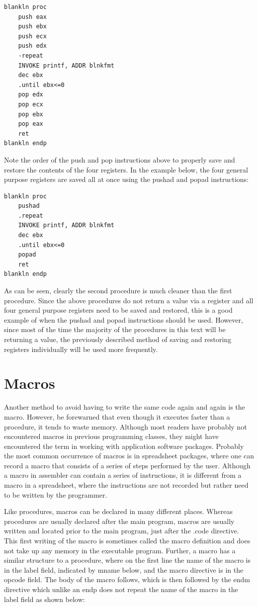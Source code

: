 \documentclass[10pt]{book}
\begin{document}
\begin{verbatim}
blankln proc
    push eax
    push ebx
    push ecx
    push edx
    -repeat
    INVOKE printf, ADDR blnkfmt
    dec ebx
    .until ebx<=0
    pop edx
    pop ecx
    pop ebx
    pop eax
    ret
blankln endp
\end{verbatim}

Note the order of the push and pop instructions above to properly save and restore the contents of the four registers. In the example below, the four general purpose registers are saved all at once using the pushad and popad instructions:

\begin{verbatim}
blankln proc
    pushad
    .repeat
    INVOKE printf, ADDR blnkfmt
    dec ebx
    .until ebx<=0
    popad
    ret
blankln endp
\end{verbatim}

As can be seen, clearly the second procedure is much cleaner than the first procedure. Since the above procedures do not return a value via a register and all four general purpose registers need to be saved and restored, this is a good example of when the pushad and popad instructions should be used. However, since most of the time the majority of the procedures in this text will be returning a value, the previously described method of saving and restoring registers individually will be used more frequently.

\section{Macros}
Another method to avoid having to write the same code again and again is the macro. However, be forewarned that even though it executes faster than a procedure, it tends to waste memory. Although most readers have probably not encountered macros in previous programming classes, they might have encountered the term in working with application software packages. Probably the most common occurrence of macros is in spreadsheet packages, where one can record a macro that consists of a series of steps performed by the user. Although a macro in assembler can contain a series of instructions, it is different from a macro in a spreadsheet, where the instructions are not recorded but rather need to be written by the programmer.

Like procedures, macros can be declared in many different places. Whereas procedures are usually declared after the main program, macros are usually written and located prior to the main program, just after the .code directive. This first writing of the macro is sometimes called the macro definition and does not take up any memory in the executable program. Further, a macro has a similar structure to a procedure, where on the first line the name of the macro is in the label field, indicated by mname below, and the macro directive is in the opcode field. The body of the macro follows, which is then followed by the endm directive which unlike an endp does not repeat the name of the macro in the label field as shown below:
\end{document}
